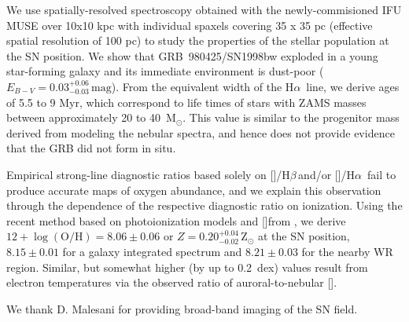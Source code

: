 \documentclass[traditabstract]{aa}
\newcommand{\hb}{H$\beta$}
\newcommand{\ha}{H$\alpha$}
\newcommand{\oh}{$12+\log(\mathrm{O/H})$}
\newcommand{\sii}{[\ion{S}{ii}]}
\newcommand{\siii}{[\ion{S}{iii}]}
\newcommand{\oiii}{[\ion{O}{iii}]}
\newcommand{\nii}{[\ion{N}{ii}]}
\begin{document}
We use spatially-resolved spectroscopy obtained with the newly-commisioned IFU MUSE over 10x10 kpc with individual spaxels covering 35 x 35 pc (effective spatial resolution of 100 pc) to study the properties of the stellar population at the SN position. We show that GRB~980425/SN1998bw exploded in a young star-forming galaxy and its immediate environment is dust-poor ($E_{B-V} = 0.03_{-0.03}^{+0.06}\,\mathrm{mag}$). From the equivalent width of the \ha\, line, we derive ages of 5.5 to 9 Myr, which correspond to life times of stars with ZAMS masses between approximately 20 to 40~M$_{\odot}$. This value is similar to the progenitor mass derived from modeling the nebular spectra, and hence does not provide evidence that the GRB did not form in situ.

Empirical strong-line diagnostic ratios based solely on \oiii/\hb\,and/or \nii/\ha\, fail to produce accurate maps of oxygen abundance, and we explain this observation through the dependence of the respective diagnostic ratio on ionization. Using the recent method based on photoionization models and \sii from \citet{2016Ap&SS.361...61D}, we derive \oh$=8.06\pm 0.06$ or $Z=0.20_{-0.02}^{+0.04}$\,Z$_{\odot}$ at the SN position, $8.15 \pm 0.01$ for a galaxy integrated spectrum and $8.21\pm 0.03$ for the nearby WR region. Similar, but somewhat higher (by up to 0.2~dex) values result from electron temperatures via the observed ratio of auroral-to-nebular \siii.




\begin{acknowledgements}

We thank D. Malesani for providing broad-band imaging of the SN field.

\end{acknowledgements}






\end{document}
